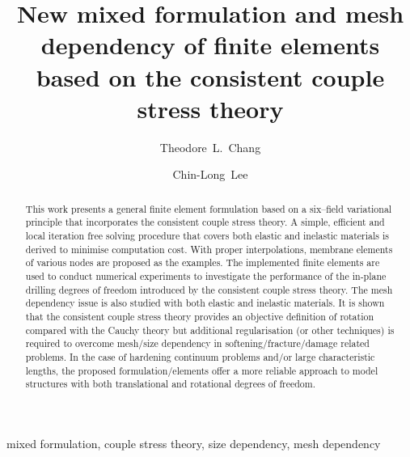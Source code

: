 \documentclass[3p,sort&compress,11pt,fleqn,review]{elsarticle}
\begin{document}
\begin{abstract}
This work presents a general finite element formulation based on a six--field variational principle that incorporates the consistent couple stress theory. A simple, efficient and local iteration free solving procedure that covers both elastic and inelastic materials is derived to minimise computation cost. With proper interpolations, membrane elements of various nodes are proposed as the examples. The implemented finite elements are used to conduct numerical experiments to investigate the performance of the in-plane drilling degrees of freedom introduced by the consistent couple stress theory. The mesh dependency issue is also studied with both elastic and inelastic materials. It is shown that the consistent couple stress theory provides an objective definition of rotation compared with the Cauchy theory but additional regularisation (or other techniques) is required to overcome mesh/size dependency in softening/fracture/damage related problems. \alert{In the case of hardening continuum problems and/or large characteristic lengths, the proposed formulation/elements offer a more reliable approach to model structures with both translational and rotational degrees of freedom.}
\end{abstract}
\begin{keyword}
mixed formulation\sep
couple stress theory\sep
size dependency\sep
mesh dependency
\end{keyword}
\begin{frontmatter}
\title{New mixed formulation and mesh dependency of finite elements based on the consistent couple stress theory}
\author[]{Theodore~L.~Chang}
\author[]{Chin-Long~Lee}
\address{Department of Civil and Natural Resources Engineering, University of Canterbury, Christchurch, New Zealand, 8041.}
\end{frontmatter}
\end{document}
